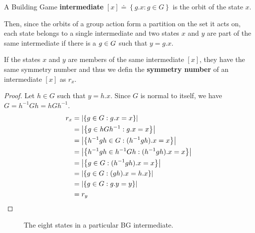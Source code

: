 \begin{mydef}
A Building Game \textbf{intermediate} $[x] \doteq \left\{g.x : g \in G\right\}$ is the orbit of the state $x$. 
\end{mydef}
Then, since the orbits of a group action form a partition on the set it acts on, each state belongs to a single intermediate and two states $x$ and $y$ are part of the same intermediate if there is a $g\in{G}$ such that $y = g.x$. 


\begin{mythm}
If the states $x$ and $y$ are members of the same intermediate $\left[x\right]$, they have the same symmetry number and thus we defin the \textbf{symmetry number} of an intermediate $\left[x\right]$ as $r_x$.
\end{mythm}
\begin{proof}
Let $h \in G$ such that $y = h.x$. Since $G$ is normal to itself, we have $G = h^{-1}Gh = hGh^{-1}$.
\begin{align}
  r_x &= \left|\left\{g \in {G} :g. x = x \right\}\right| \\
  &= \left|\left\{g \in h{G} h^{-1} : g.x = x \right\}\right| \\
  &= \left|\left\{ h^{-1}gh \in {G} : (h^{-1}gh).x = x \right\}\right| \\
  &= \left|\left\{ h^{-1}gh \in h^{-1}Gh : (h^{-1}gh).x = x \right\}\right| \\
  &= \left|\left\{ g \in G : (h^{-1}gh).x = x \right\}\right| \\
  &= \left|\left\{ g \in G : (gh).x = h.x \right\}\right| \\
  &= \left|\left\{ g \in G : g.y = y \right\}\right| \\
  &= r_y
\end{align}
\end{proof}


\begin{figure}[ht]
\caption{The eight states in a particular BG intermediate.}
\label{fig:CubeState}
\end{figure}


